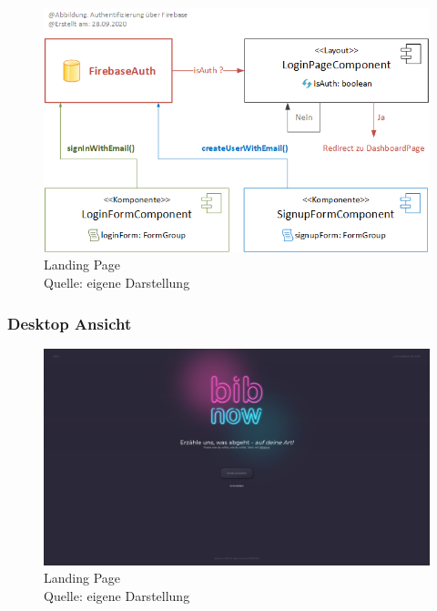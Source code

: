 \documentclass[12pt,titlepage]{article}
\begin{document}
\begin{figure}[hbt!]
\centering
\includegraphics[width=400pt]{abbildungen/Abbildung_Authentifizierung_LoginPage.png}
\caption[Srenshot Landing Page]{Landing Page \\Quelle: eigene Darstellung}
\end{figure}

\FloatBarrier

\subsubsection{Desktop Ansicht}

\begin{figure}[hbt!]
\centering
\includegraphics[width=400pt]{screenshots/Screenshot_Desktop1.png}
\caption[Srenshot Landing Page]{Landing Page \\Quelle: eigene Darstellung}
\end{figure}
\end{document}
